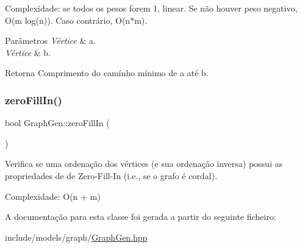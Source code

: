 Complexidade\+: se todos os pesos forem 1, linear. Se não houver peso negativo, O(m log(n)). Caso contrário, O(n$\ast$m). 
\begin{DoxyParams}{Parâmetros}
{\em Vértice} & \textquotesingle{}a\textquotesingle{}. \\
\hline
{\em Vértice} & \textquotesingle{}b\textquotesingle{}. \\
\hline
\end{DoxyParams}
\begin{DoxyReturn}{Retorna}
Comprimento do camínho mínimo de \textquotesingle{}a\textquotesingle{} até \textquotesingle{}b\textquotesingle{}. 
\end{DoxyReturn}
\mbox{\label{classGraphGen_ad22d4dd7a1006663e1ba653c16b26e1a}} 
\subsubsection{\texorpdfstring{zeroFillIn()}{zeroFillIn()}}
{\footnotesize\ttfamily bool Graph\+Gen\+::zero\+Fill\+In (\begin{DoxyParamCaption}{ }\end{DoxyParamCaption})\hspace{0.3cm}{\ttfamily [protected]}}

Verifica se uma ordenação dos vértices (e sua ordenação inversa) possui as propriedades de de Zero-\/\+Fill-\/\+In (i.\+e., se o grafo é cordal).

Complexidade\+: O(n + m) 

A documentação para esta classe foi gerada a partir do seguinte ficheiro\+:\begin{DoxyCompactItemize}
\item 
include/models/graph/\mbox{\hyperlink{GraphGen_8hpp}{Graph\+Gen.\+hpp}}\end{DoxyCompactItemize}
